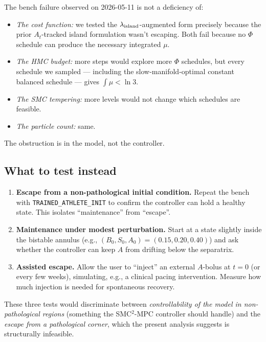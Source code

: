 \documentclass[11pt,a4paper]{article}
\theoremstyle{definition}
\begin{document}
The bench failure observed on 2026-05-11 is not a deficiency of:
\begin{itemize}
  \item \emph{The cost function:} we tested the $\lambda_{\rm island}$-augmented form precisely because the prior $A_t$-tracked island formulation wasn't escaping. Both fail because no $\Phi$ schedule can produce the necessary integrated $\mu$.
  \item \emph{The HMC budget:} more steps would explore more $\Phi$ schedules, but every schedule we sampled — including the slow-manifold-optimal constant balanced schedule — gives $\int \mu < \ln 3$.
  \item \emph{The SMC tempering:} more levels would not change which schedules are feasible.
  \item \emph{The particle count:} same.
\end{itemize}
The obstruction is in the model, not the controller.

\subsection{What to test instead}

\begin{enumerate}
  \item \textbf{Escape from a non-pathological initial condition.} Repeat the bench with \texttt{TRAINED\_ATHLETE\_INIT} to confirm the controller can hold a healthy state. This isolates ``maintenance'' from ``escape''.
  \item \textbf{Maintenance under modest perturbation.} Start at a state slightly inside the bistable annulus (e.g., $(B_0, S_0, A_0) = (0.15, 0.20, 0.40)$) and ask whether the controller can keep $A$ from drifting below the separatrix.
  \item \textbf{Assisted escape.} Allow the user to ``inject'' an external $A$-bolus at $t=0$ (or every few weeks), simulating, e.g., a clinical pacing intervention. Measure how much injection is needed for spontaneous recovery.
\end{enumerate}

These three tests would discriminate between \emph{controllability of the model in non-pathological regions} (something the SMC$^2$-MPC controller should handle) and the \emph{escape from a pathological corner}, which the present analysis suggests is structurally infeasible.

\end{document}
